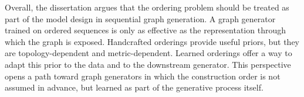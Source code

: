 Overall, the dissertation argues that the ordering problem should be treated as part of the model design in sequential graph generation. A graph generator trained on ordered sequences is only as effective as the representation through which the graph is exposed. Handcrafted orderings provide useful priors, but they are topology-dependent and metric-dependent. Learned orderings offer a way to adapt this prior to the data and to the downstream generator. This perspective opens a path toward graph generators in which the construction order is not assumed in advance, but learned as part of the generative process itself.
